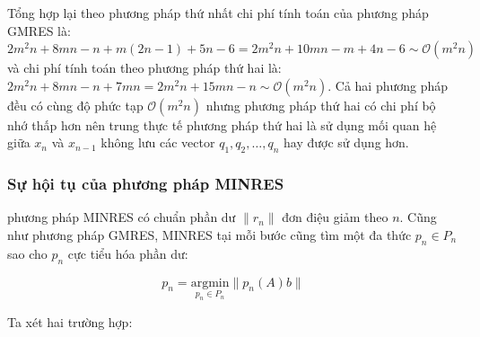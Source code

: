 \documentclass[14pt, a4paper]{article}
\numberwithin{equation}{section}
\numberwithin{algorithm}{section}
\numberwithin{figure}{section}
\numberwithin{dl}{section}
\numberwithin{md}{section}
\numberwithin{bd}{section}
\numberwithin{dn}{section}
\begin{document}
Tổng hợp lại theo phương pháp thứ nhất chi phí tính toán của phương pháp GMRES là: $2m^2n+8mn-n+m(2n-1)+5n-6=2m^2n+10mn-m+4n-6 \sim \mathcal{O}(m^2n)$ và chi phí tính toán theo phương pháp thứ hai là: $2m^2n+8mn-n + 7mn=2m^2n+15mn-n \sim \mathcal{O}(m^2n)$. Cả hai phương pháp đều có cùng độ phức tạp $\mathcal{O}(m^2n)$ nhưng phương pháp thứ hai có chi phí bộ nhớ thấp hơn nên trung thực tế phương pháp thứ hai là sử dụng mối quan hệ giữa $x_n$ và $x_{n-1}$ không lưu các vector $q_1, q_2, \dots, q_n$ hay được sử dụng hơn.

\subsubsection{Sự hội tụ của phương pháp MINRES}

phương pháp MINRES có chuẩn phần dư $\lVert r_n \rVert $ đơn điệu giảm theo $n$. Cũng như phương pháp GMRES, MINRES tại mỗi bước cũng tìm một đa thức $p_n \in P_n$ sao cho $p_n$ cực tiểu hóa phần dư:

\begin{equation}
    p_n = \underset{p_n \in P_n}{\mathrm{argmin}} \lVert p_n(A)b \rVert
\end{equation}

Ta xét hai trường hợp:
\end{document}
